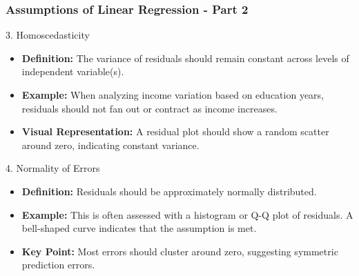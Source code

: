 \documentclass[aspectratio=169]{beamer}
\begin{document}
\begin{frame}[fragile]
    \frametitle{Assumptions of Linear Regression - Part 2}
    \begin{block}{3. Homoscedasticity}
        \begin{itemize}
            \item \textbf{Definition:} The variance of residuals should remain constant across levels of independent variable(s).
            \item \textbf{Example:} When analyzing income variation based on education years, residuals should not fan out or contract as income increases.
            \item \textbf{Visual Representation:} A residual plot should show a random scatter around zero, indicating constant variance.
        \end{itemize}
    \end{block}

    \begin{block}{4. Normality of Errors}
        \begin{itemize}
            \item \textbf{Definition:} Residuals should be approximately normally distributed.
            \item \textbf{Example:} This is often assessed with a histogram or Q-Q plot of residuals. A bell-shaped curve indicates that the assumption is met.
            \item \textbf{Key Point:} Most errors should cluster around zero, suggesting symmetric prediction errors.
        \end{itemize}
    \end{block}
\end{frame}
\end{document}
